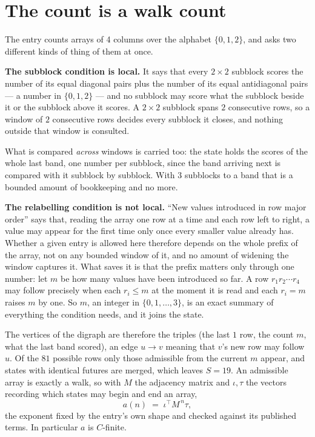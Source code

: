 \documentclass[11pt,a4paper]{article}
\theoremstyle{plain}
\theoremstyle{definition}
\begin{document}
\section{The count is a walk count}

The entry counts arrays of 4 columns over the alphabet $\{0,1,2\}$, and asks two different kinds of thing of them at once.

\textbf{The subblock condition is local.} It says that every $2\times2$ subblock scores the number of its equal diagonal pairs plus the number of its equal antidiagonal pairs --- a number in $\{0,1,2\}$ --- and no subblock may score what the subblock beside it or the subblock above it scores. A $ 2\times2$ subblock spans $2$ consecutive rows, so a window of $2$ consecutive rows decides every subblock it closes, and nothing outside that window is consulted.

What is compared \emph{across} windows is carried too: the state holds the scores of the whole last band, one number per subblock, since the band arriving next is compared with it subblock by subblock. With $3$ subblocks to a band that is a bounded amount of bookkeeping and no more.

\textbf{The relabelling condition is not local.} ``New values introduced in row major order'' says that, reading the array one row at a time and each row left to right, a value may appear for the first time only once every smaller value already has. Whether a given entry is allowed here therefore depends on the whole prefix of the array, not on any bounded window of it, and no amount of widening the window captures it. What saves it is that the prefix matters only through one number: let $m$ be how many values have been introduced so far. A row $r_1r_2\cdots r_4$ may follow precisely when each $r_i\le m$ at the moment it is read and each $r_i=m$ raises $m$ by one. So $m$, an integer in $\{0,1,\dots,3\}$, is an exact summary of everything the condition needs, and it joins the state.

The vertices of the digraph are therefore the triples (the last $1$ row, the count $m$, what the last band scored), an edge $u\to v$ meaning that $v$'s new row may follow $u$. Of the $81$ possible rows only those admissible from the current $m$ appear, and states with identical futures are merged, which leaves $S=19$. An admissible array is exactly a walk, so with $M$ the adjacency matrix and $\iota,\tau$ the vectors recording which states may begin and end an array,
\[
a(n)\;=\;\iota^{\!\top}M^{\,n}\tau ,
\]
the exponent fixed by the entry's own shape and checked against its published terms. In
particular $a$ is $C$-finite.
\end{document}
